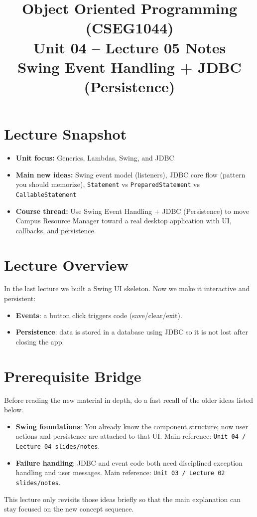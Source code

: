 \documentclass[11pt]{article}
\title{Object Oriented Programming (CSEG1044)\\Unit 04 -- Lecture 05 Notes\\Swing Event Handling + JDBC (Persistence)}
\begin{document}
\maketitle
\tableofcontents

\section{Lecture Snapshot}
\begin{itemize}
  \item \textbf{Unit focus:} Generics, Lambdas, Swing, and JDBC
  \item \textbf{Main new ideas:} Swing event model (listeners), JDBC core flow (pattern you should memorize), \texttt{Statement} vs \texttt{PreparedStatement} vs \texttt{CallableStatement}
  \item \textbf{Course thread:} Use Swing Event Handling + JDBC (Persistence) to move Campus Resource Manager toward a real desktop application with UI, callbacks, and persistence.
\end{itemize}
\notesources{\OOPSUnitIVSources}

\section{Lecture Overview}
In the last lecture we built a Swing UI skeleton.
Now we make it interactive and persistent:
\begin{itemize}
  \item \textbf{Events}: a button click triggers code (save/clear/exit).
  \item \textbf{Persistence}: data is stored in a database using JDBC so it is not lost after closing the app.
\end{itemize}
\notesources{\OOPSUnitIVSources}

\section{Prerequisite Bridge}
Before reading the new material in depth, do a fast recall of the older ideas listed below.
\begin{itemize}
  \item \textbf{Swing foundations}: You already know the component structure; now user actions and persistence are attached to that UI. Main reference: \texttt{Unit 04 / Lecture 04 slides/notes}.
  \item \textbf{Failure handling}: JDBC and event code both need disciplined exception handling and user messages. Main reference: \texttt{Unit 03 / Lecture 02 slides/notes}.
\end{itemize}
This lecture only revisits those ideas briefly so that the main explanation can stay focused on the new concept sequence.
\notesources{\OOPSUnitIVSources}
\end{document}
